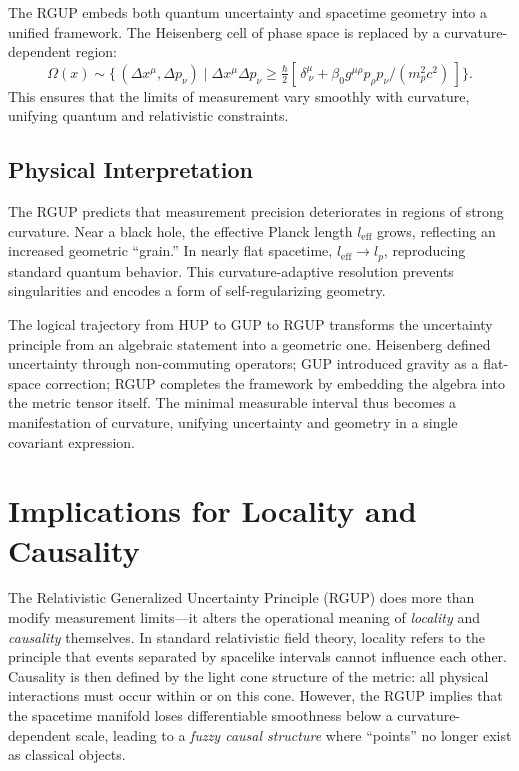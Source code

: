 \documentclass[11pt,oneside]{book}
\newenvironment{booknote}{
  \begin{tcolorbox}[
    colback=gray!3!white,
    colframe=gray!45!black,
    fonttitle=\bfseries,
    title=\textbf{Book Note},
  ]
}{\end{tcolorbox}}
\numberwithin{equation}{chapter}
\begin{document}
The RGUP embeds both quantum uncertainty and spacetime geometry into a unified framework.  
The Heisenberg cell of phase space is replaced by a curvature-dependent region:
\begin{equation}
\Omega(x) \sim
\{\,(\Delta x^\mu,\Delta p_\nu)\mid
\Delta x^\mu\Delta p_\nu \ge \tfrac{\hbar}{2}
[\,\delta^\mu_{\ \nu}
+\beta_0 g^{\mu\rho}p_\rho p_\nu/(m_p^2 c^2)\,]\}.
\end{equation}
This ensures that the limits of measurement vary smoothly with curvature, unifying quantum and relativistic constraints.

\subsection*{Physical Interpretation}

The RGUP predicts that measurement precision deteriorates in regions of strong curvature.  
Near a black hole, the effective Planck length $l_{\text{eff}}$ grows, reflecting an increased geometric “grain.”  
In nearly flat spacetime, $l_{\text{eff}}\!\to\!l_p$, reproducing standard quantum behavior.  
This curvature-adaptive resolution prevents singularities and encodes a form of self-regularizing geometry. \vspace{0.8em}

\begin{booknote}
The logical trajectory from HUP to GUP to RGUP transforms the uncertainty principle from an algebraic statement into a geometric one.  
Heisenberg defined uncertainty through non-commuting operators; GUP introduced gravity as a flat-space correction; RGUP completes the framework by embedding the algebra into the metric tensor itself.  
The minimal measurable interval thus becomes a manifestation of curvature, unifying uncertainty and geometry in a single covariant expression.
\end{booknote}
\clearpage
\section{Implications for Locality and Causality}

The Relativistic Generalized Uncertainty Principle (RGUP) does more than modify measurement limits—it alters the operational meaning of \emph{locality} and \emph{causality} themselves.  
In standard relativistic field theory, locality refers to the principle that events separated by spacelike intervals cannot influence each other.  
Causality is then defined by the light cone structure of the metric: all physical interactions must occur within or on this cone.  
However, the RGUP implies that the spacetime manifold loses differentiable smoothness below a curvature-dependent scale, leading to a \emph{fuzzy causal structure} where “points” no longer exist as classical objects.  
\end{document}
